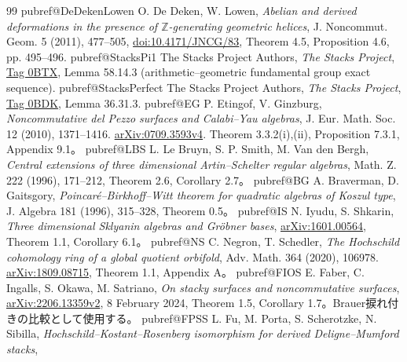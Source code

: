 \begin{thebibliography}{99}
\small
\linespread{0.94}\selectfont
\setlength{\itemsep}{0pt}
\ifcsname pubref@DeDekenLowen\endcsname
{} O. De Deken, W. Lowen,
\emph{Abelian and derived deformations in the presence of $\mathbb Z$-generating geometric helices},
J. Noncommut. Geom. 5 (2011), 477--505,
\href{https://doi.org/10.4171/JNCG/83}{doi:10.4171/JNCG/83}, Theorem 4.5, Proposition 4.6, pp. 495--496.
\fi
\ifcsname pubref@StacksPi1\endcsname
{} The Stacks Project Authors,
\emph{The Stacks Project},
\href{https://stacks.math.columbia.edu/tag/0BTX}{Tag 0BTX}, Lemma 58.14.3
(arithmetic--geometric fundamental group exact sequence).
\fi
\ifcsname pubref@StacksPerfect\endcsname
{} The Stacks Project Authors,
\emph{The Stacks Project},
\href{https://stacks.math.columbia.edu/tag/0BDK}{Tag 0BDK}, Lemma 36.31.3.
\fi
\ifcsname pubref@EG\endcsname
{} P. Etingof, V. Ginzburg,
\emph{Noncommutative del Pezzo surfaces and Calabi--Yau algebras},
J. Eur. Math. Soc. 12 (2010), 1371--1416.
\href{https://arxiv.org/abs/0709.3593v4}{arXiv:0709.3593v4}.
Theorem 3.3.2(i),(ii), Proposition 7.3.1, Appendix 9.1。
\fi
\ifcsname pubref@LBS\endcsname
{} L. Le Bruyn, S. P. Smith, M. Van den Bergh,
\emph{Central extensions of three dimensional Artin--Schelter regular algebras},
Math. Z. 222 (1996), 171--212, Theorem 2.6, Corollary 2.7。
\fi
\ifcsname pubref@BG\endcsname
{} A. Braverman, D. Gaitsgory,
\emph{Poincar\'e--Birkhoff--Witt theorem for quadratic algebras of Koszul type},
J. Algebra 181 (1996), 315--328, Theorem 0.5。
\fi
\ifcsname pubref@IS\endcsname
{} N. Iyudu, S. Shkarin,
\emph{Three dimensional Sklyanin algebras and Gr\"obner bases},
\href{https://arxiv.org/abs/1601.00564}{arXiv:1601.00564}, Theorem 1.1, Corollary 6.1。
\fi
\ifcsname pubref@NS\endcsname
{} C. Negron, T. Schedler,
\emph{The Hochschild cohomology ring of a global quotient orbifold},
Adv. Math. 364 (2020), 106978.
\href{https://arxiv.org/abs/1809.08715}{arXiv:1809.08715}, Theorem 1.1, Appendix A。
\fi
\ifcsname pubref@FIOS\endcsname
{} E. Faber, C. Ingalls, S. Okawa, M. Satriano,
\emph{On stacky surfaces and noncommutative surfaces},
\href{https://arxiv.org/abs/2206.13359v2}{arXiv:2206.13359v2}, 8 February 2024,
Theorem 1.5, Corollary 1.7。Brauer捩れ付きの比較として使用する。
\fi
\ifcsname pubref@FPSS\endcsname
{} L. Fu, M. Porta, S. Scherotzke, N. Sibilla,
\emph{Hochschild--Kostant--Rosenberg isomorphism for derived Deligne--Mumford stacks},

\end{thebibliography}
